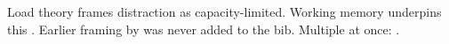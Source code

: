 \documentclass{article}
\begin{document}
Load theory \cite{lavie2010attention} frames distraction as capacity-limited.
Working memory underpins this \citep{baddeley2003working, missingkey2020}.
Earlier framing by \citet[see][p.~4]{ghostpaper1999} was never added to the bib.
Multiple at once: \cite{lavie2010attention,anotherghost2021}.
\end{document}
